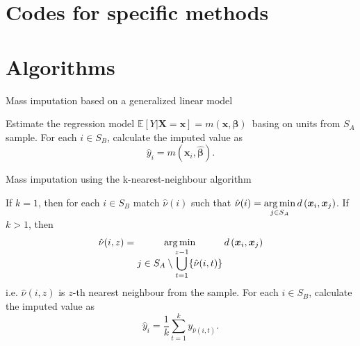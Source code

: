 \documentclass[
]{jss}
\begin{document}
\clearpage

\clearpage

\section{Codes for specific methods}\label{sec-examples}

\clearpage

\section{Algorithms}\label{sec-details}

\begin{algorithm}[ht!]
\caption{Mass imputation based on a generalized linear model}
\label{algo-1}
\begin{algorithmic}[1]
 \State Estimate the regression model $\mathbb{E}[Y|\boldsymbol{X}=\boldsymbol{x}]=m(\boldsymbol{x}, \boldsymbol{\beta})$\ basing on units from $S_A$ sample.
 \State For each $i \in S_B$, calculate the imputed value as
 $$
 \hat{y}_i = m\left(\boldsymbol{x}_{i},\hat{\boldsymbol{\beta}}\right).
 $$
\end{algorithmic}
\end{algorithm}

\begin{algorithm}[ht!]
\caption{Mass imputation using the k-nearest-neighbour algorithm}
\label{algo-2}
\begin{algorithmic}[1]
\State If $k=1$, then for each $i \in S_B$ match $\hat{\nu}(i)$ such that
$\displaystyle \hat{\nu}(i)=
\operatornamewithlimits{arg\,min}_{j\in S_{A}}d\left(\boldsymbol{x}_i,\boldsymbol{x}_j\right)$.
\State If $k>1$, then
$$\hat{\nu}(i, z) = \operatornamewithlimits{arg\,min}_{\displaystyle j\in S_{A}\setminus\bigcup_{t=1}^{z-1}
\{\hat{\nu}(i, t)\}} d\left(\boldsymbol{x}_i, \boldsymbol{x}_j\right)$$
i.e. $\hat{\nu}(i, z)$ is $z$-th nearest neighbour from the sample.\;
\State For each $i \in S_B$, calculate the imputed value as
$$
\hat{y}_i = \frac{1}{k}\sum_{t=1}^{k}y_{\hat{\nu}(i, t)}.
$$
\end{algorithmic}
\end{algorithm}
\end{document}
